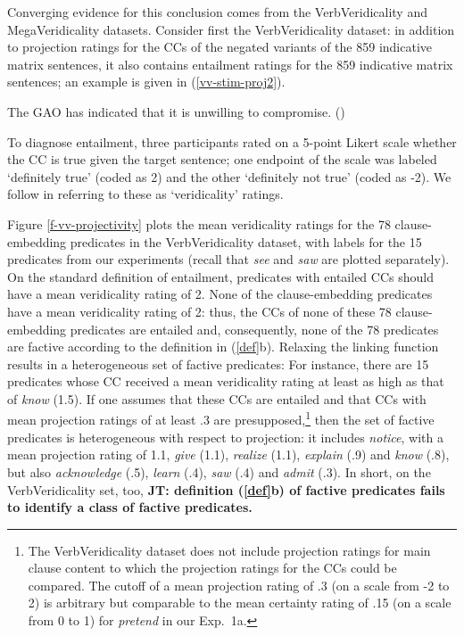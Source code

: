 \documentclass[11pt,fleqn]{article}
\newcommand{\6}{\mbox{$[\hspace*{-.6mm}[$}}
\newcommand{\9}{\mbox{$]\hspace*{-.6mm}]$}}
\newcommand{\jt}[1]{\textbf{\color{blue}JT: #1}}
\begin{document}
Converging evidence for this conclusion comes from the VerbVeridicality and MegaVeridicality datasets. Consider first the VerbVeridicality dataset: in addition to projection ratings for the CCs of the negated variants of the 859 indicative matrix sentences, it also contains entailment ratings for the 859 indicative matrix sentences; an example is given in (\ref{vv-stim-proj2}). 

\begin{exe}
\ex\label{vv-stim-proj2} The GAO has indicated that it is unwilling to compromise.  \hfill (\citealt[2234]{ross-pavlick2019})
\end{exe}
To diagnose entailment, three participants rated on a 5-point Likert scale whether the CC is true given the target sentence; one endpoint of the scale was labeled `definitely true' (coded as 2) and the other `definitely not true' (coded as -2). We follow \citet{ross-pavlick2019} in referring to these as `veridicality' ratings. 

Figure \ref{f-vv-projectivity} plots the mean veridicality ratings for the 78 clause-embedding predicates in the VerbVeridicality dataset, with labels for the 15 predicates from our experiments (recall that {\em see} and {\em saw} are plotted separately). On the standard definition of entailment, predicates with entailed CCs should have a mean veridicality rating of 2. None of the clause-embedding predicates have a mean veridicality rating of 2: thus, the CCs of none of these 78 clause-embedding predicates are entailed and, consequently, none of the 78 predicates are factive according to the definition in (\ref{def}b). Relaxing the linking function results in a heterogeneous set of factive predicates: For instance, there are 15 predicates whose CC received a mean veridicality rating at least as high as that of {\em know} (1.5). If one assumes that these CCs are entailed and that CCs with mean projection ratings of at least .3 are presupposed,\footnote{The VerbVeridicality dataset does not include projection ratings for main clause content to which the projection ratings for the CCs could be compared. The cutoff of a mean projection rating of .3 (on a scale from -2 to 2) is arbitrary but comparable to the mean certainty rating of .15 (on a scale from 0 to 1) for {\em pretend} in our Exp.~1a.} then the set of factive predicates is heterogeneous with respect to projection: it includes {\em notice}, with a mean projection rating of 1.1, {\em give} (1.1), {\em realize} (1.1), {\em explain} (.9) and {\em know} (.8), but also {\em acknowledge} (.5), {\em learn} (.4), {\em saw} (.4) and {\em admit} (.3). In short, on the VerbVeridicality set, too, \jt{definition (\ref{def}b) of factive predicates fails to identify a class of factive predicates.}
\end{document}
